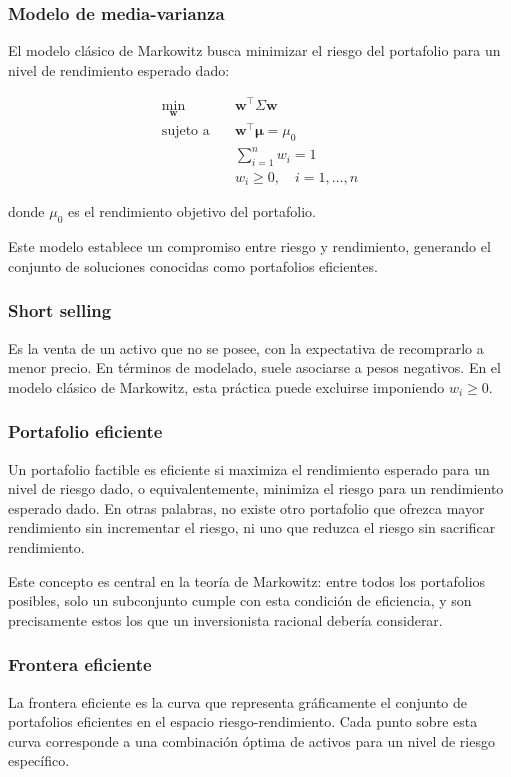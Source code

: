 \subsubsection{Modelo de media-varianza}

El modelo clásico de Markowitz busca minimizar el riesgo del portafolio
para un nivel de rendimiento esperado dado:

\begin{align}
  \min_{\mathbf{w}} \quad & \mathbf{w}^{\top}\Sigma\mathbf{w} \\
  \text{sujeto a} \quad & \mathbf{w}^{\top}\boldsymbol{\mu} = \mu_0 \\
  & \sum_{i=1}^{n} w_i = 1 \\
  & w_i \geq 0, \quad i = 1, \dots, n
\end{align}

donde $\mu_0$ es el rendimiento objetivo del portafolio.

Este modelo establece un compromiso entre riesgo y rendimiento,
generando el conjunto de soluciones conocidas como portafolios eficientes.

\subsubsection{Short selling}
Es la venta de un activo que no se posee, con la expectativa de
recomprarlo a menor precio. En términos de modelado, suele asociarse a
pesos negativos. En el modelo clásico de Markowitz, esta práctica
puede excluirse imponiendo $w_i \ge 0$.

\subsubsection{Portafolio eficiente}
Un portafolio factible es eficiente si maximiza el rendimiento
esperado para un nivel de riesgo dado, o equivalentemente, minimiza
el riesgo para un rendimiento esperado dado. En otras palabras, no
existe otro portafolio que ofrezca mayor rendimiento sin incrementar
el riesgo, ni uno que reduzca el riesgo sin sacrificar rendimiento.

Este concepto es central en la teoría de Markowitz: entre todos los
portafolios posibles, solo un subconjunto cumple con esta condición
de eficiencia, y son precisamente estos los que un inversionista
racional debería considerar.

\subsubsection{Frontera eficiente}
La frontera eficiente es la curva que representa gráficamente el
conjunto de portafolios eficientes en el espacio riesgo-rendimiento.
Cada punto sobre esta curva corresponde a una combinación óptima de
activos para un nivel de riesgo específico.

